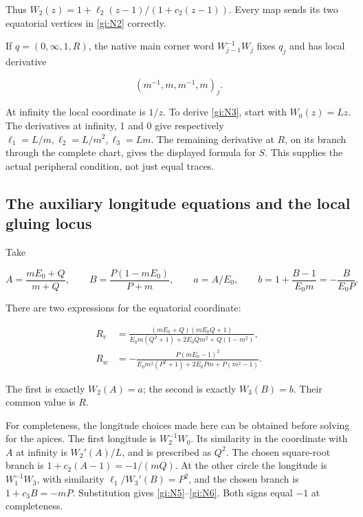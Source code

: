Thus \(W_2(z)=1+\ell_2(z-1)/(1+c_2(z-1))\).
Every map sends its two equatorial vertices in \eqref{gi:N2} correctly.

If \(q=(0,\infty,1,R)\), the native main corner word
\(W_{j-1}^{-1}W_j\) fixes \(q_j\) and has local derivative

\begin{equation}\label{gi:N4}
(m^{-1},m,m^{-1},m)_j.
\end{equation}

At infinity the local coordinate is \(1/z\). To derive \eqref{gi:N3},
start with \(W_0(z)=Lz\). The derivatives at infinity, 1 and 0
give respectively \(\ell_1=L/m,\ell_2=L/m^2,\ell_3=Lm\).
The remaining derivative at \(R\), on its branch through the
complete chart, gives the displayed formula for \(S\).
This supplies the actual peripheral condition, not just equal traces.

\subsection{The auxiliary longitude equations and the local gluing locus}\label{gi:the-auxiliary-longitude-equations-and-the-local-gluing-locus}

Take

\begin{equation}\label{gi:N5}
A=\frac{mE_0+Q}{m+Q},\qquad B=\frac{P(1-mE_0)}{P+m},\qquad
 a=A/E_0,\qquad b=1+\frac{B-1}{E_0m}=-\frac{B}{E_0P}.
\end{equation}

There are two expressions for the equatorial coordinate:

\begin{equation}\label{gi:N6}
\begin{aligned}
 R_v&=\frac{(mE_0+Q)(mE_0Q+1)}
 {E_0m(Q^2+1)+2E_0Qm^2+Q(1-m^2)},\\
 R_w&=-\frac{P(mE_0-1)^2}
 {E_0m^2(P^2+1)+2E_0Pm+P(m^2-1)}.
\end{aligned}
\end{equation}

The first is exactly \(W_2(A)=a\); the second is exactly
\(W_3(B)=b\). Their common value is \(R\).

For completeness, the longitude choices made here can be obtained
before solving for the apices. The first longitude is
\(W_2^{-1}W_0\). Its similarity in the coordinate with \(A\)
at infinity is \(W_2'(A)/L\), and is prescribed as \(Q^2\).
The chosen square-root branch is
\(1+c_2(A-1)=-1/(mQ)\). At the other circle the longitude is
\(W_1^{-1}W_3\), with similarity
\(\ell_1/W_3'(B)=P^2\), and the chosen branch is
\(1+c_3B=-mP\). Substitution gives \eqref{gi:N5}--\eqref{gi:N6}.
Both signs equal \(-1\) at completeness.

